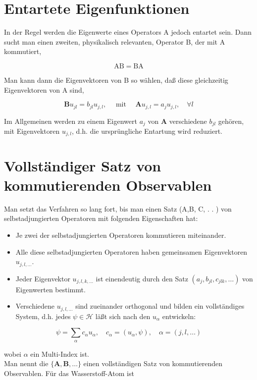 \documentclass[10pt, letterpaper]{article}
\begin{document}
\section*{Entartete Eigenfunktionen}
In der Regel werden die Eigenwerte eines Operators A jedoch entartet sein. Dann sucht man einen zweiten, physikalisch relevanten, Operator B, der mit A kommutiert,

$$
\mathrm{AB}=\mathrm{BA}
$$

Man kann dann die Eigenvektoren von B so wählen, daß diese gleichzeitig Eigenvektoren von A sind,

$$
\mathbf{B} u_{j l}=b_{j l} u_{j, l}, \quad \text { mit } \quad \mathbf{A} u_{j, l}=a_{j} u_{j, l}, \quad \forall l
$$

Im Allgemeinen werden zu einem Eigenwert $a_{j}$ von $\mathbf{A}$ verschiedene $b_{j l}$ gehören, mit Eigenvektoren $u_{j, l}$, d.h. die ursprüngliche Entartung wird reduziert.

\section*{Vollständiger Satz von kommutierenden Observablen}
Man setzt das Verfahren so lang fort, bis man einen Satz (A,B, C, . . ) von selbstadjungierten Operatoren mit folgenden Eigenschaften hat:

\begin{itemize}
  \item Je zwei der selbstadjungierten Operatoren kommutieren miteinander.
  \item Alle diese selbstadjungierten Operatoren haben gemeinsamen Eigenvektoren $u_{j, l, \ldots}$.
  \item Jeder Eigenvektor $u_{j, l, k, \ldots}$ ist einendeutig durch den Satz $\left(a_{j}, b_{j l}, c_{j l k}, \ldots\right)$ von Eigenwerten bestimmt.
  \item Verschiedene $u_{j, l, \ldots}$ sind zueinander orthogonal und bilden ein vollständiges System, d.h. jedes $\psi \in \mathcal{H}$ läßt sich nach den $u_{\alpha}$ entwickeln:
\end{itemize}

$$
\psi=\sum_{\alpha} c_{\alpha} u_{\alpha}, \quad c_{\alpha}=\left(u_{\alpha}, \psi\right), \quad \alpha=(j, l, \ldots)
$$

wobei $\alpha$ ein Multi-Index ist.\\
Man nennt die $\{\mathbf{A}, \mathbf{B}, \ldots\}$ einen vollständigen Satz von kommutierenden Observablen. Für das Wasserstoff-Atom ist
\end{document}
